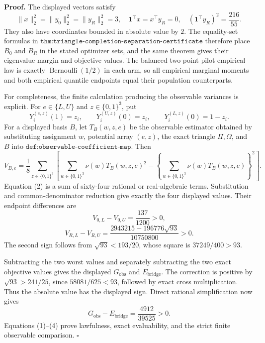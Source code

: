 \textbf{Proof.}
The displayed vectors satisfy
\[
\lVert x\rVert_2^2=\lVert y_0\rVert_2^2
=\lVert y_R\rVert_2^2=3,
\quad
\mathbf1^{\top}x=x^{\top}y_R=0,
\quad
(\mathbf1^{\top}y_R)^2=\frac{216}{55}.
\tag{1}
\]
They also have coordinates bounded in absolute value by \(2\).  The equality-set formulas in \(\texttt{thm:triangle-completion-separation-certificate}\) therefore place \(B_0\) and \(B_R\) in the stated optimizer sets, and the same theorem gives their eigenvalue margin and objective values.  The balanced two-point pilot empirical law is exactly \(\operatorname{Bernoulli}(1/2)\) in each arm, so all empirical marginal moments and both empirical quantile endpoints equal their population counterparts.

For completeness, the finite calculation producing the observable variances is explicit.  For \(e\in\{L,U\}\) and \(z\in\{0,1\}^3\), put
\[
Y_i^{(e,z)}(1)=z_i,
\qquad
Y_i^{(U,z)}(0)=z_i,
\qquad
Y_i^{(L,z)}(0)=1-z_i.
\]
For a displayed basis \(B\), let \(T_B(w,z,e)\) be the observable estimator obtained by substituting assignment \(w\), potential array \((e,z)\), the exact triangle \(\Pi,\Omega\), and \(B\) into \(\texttt{def:observable-coefficient-map}\).  Then
\[
V_{B,e}
=\frac18\sum_{z\in\{0,1\}^3}
\left[
\sum_{w\in\{0,1\}^3}\nu(w)T_B(w,z,e)^2
-\left\{\sum_{w\in\{0,1\}^3}\nu(w)T_B(w,z,e)\right\}^2
\right].
\tag{2}
\]
Equation (2) is a sum of sixty-four rational or real-algebraic terms.  Substitution and common-denominator reduction give exactly the four displayed values.  Their endpoint differences are
\[
V_{0,L}-V_{0,U}=\frac{137}{1200}>0,
\]
\[
V_{R,L}-V_{R,U}
=\frac{2943215-196776\sqrt{93}}{10750800}>0.
\tag{3}
\]
The second sign follows from \(\sqrt{93}<193/20\), whose square is \(37249/400>93\).

Subtracting the two worst values and separately subtracting the two exact objective values gives the displayed \(G_{\mathrm{obs}}\) and \(E_{\mathrm{bridge}}\).  The correction is positive by \(\sqrt{93}>241/25\), since \(58081/625<93\), followed by exact cross multiplication.  Thus the absolute value has the displayed sign.  Direct rational simplification now gives
\[
G_{\mathrm{obs}}-E_{\mathrm{bridge}}
=\frac{4912}{39525}>0.
\tag{4}
\]
Equations (1)--(4) prove lawfulness, exact evaluability, and the strict finite observable comparison. \(\square\)
